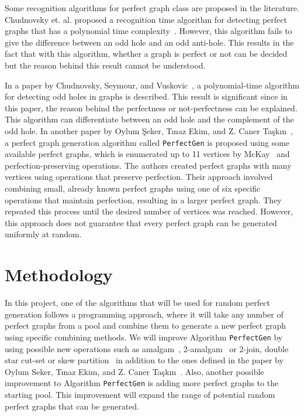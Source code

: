 \documentclass[12pt, oneside, a4paper]{article}
\begin{document}
Some recognition algorithms for perfect graph class are proposed in the literature. Chudnovsky et. al. proposed a recognition time algorithm for detecting perfect graphs that has a polynomial time complexity~\cite{berge-graph}. However, this algorithm fails to give the difference between an odd hole and an odd anti-hole. This results in the fact that with this algorithm, whether a graph is perfect or not can be decided but the reason behind this result cannot be understood.

In a paper by Chudnovsky, Seymour, and Vuskovic~\cite{odd-hole}, a polynomial-time algorithm for detecting odd holes in graphs is described. This result is significant since in this paper, the reason behind the perfectness or not-perfectness can be explained. This algorithm can differentiate between an odd hole and the complement of the odd hole.
In another paper by Oylum Şeker, Tınaz Ekim, and Z. Caner Taşkın~\cite{tinaz}, a perfect graph generation algorithm called \texttt{PerfectGen} is proposed using some available perfect graphs, which is enumerated up to 11 vertices by McKay~\cite{mckay} and perfection-preserving operations. The authors created perfect graphs with many vertices using operations that preserve perfection. Their approach involved combining small, already known perfect graphs using one of six specific operations that maintain perfection, resulting in a larger perfect graph. They repeated this process until the desired number of vertices was reached. However, this approach does not guarantee that every perfect graph can be generated uniformly at random.

\newpage

\section{Methodology}

In this project, one of the algorithms that will be used for random perfect generation follows a programming approach, where it will take any number of perfect graphs from a pool and combine them to generate a new perfect graph using specific combining methods. We will improve Algorithm \texttt{PerfectGen} by using possible new operations such as amalgam~\cite{burlet}, 2-amalgam~\cite{cornuejols} or 2-join, double star cut-set or skew partition~\cite{trotignon} in addition to the ones defined in the paper by Oylum Seker, Tınaz Ekim, and Z. Caner Taşkın~\cite{tinaz}. Also, another possible improvement to Algorithm \texttt{PerfectGen} is adding more perfect graphs to the starting pool. This improvement will expand the range of potential random perfect graphs that can be generated.
\end{document}
